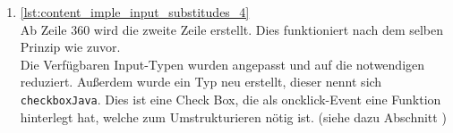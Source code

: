 \begin{enumerate}
	\item \autoref{lst:content_imple_input_substitudes_4}\\
	Ab Zeile 360 wird die zweite Zeile erstellt. Dies funktioniert nach dem selben Prinzip wie zuvor.\\
	Die Verfügbaren Input-Typen wurden angepasst und auf die notwendigen reduziert. Außerdem wurde ein Typ neu erstellt, dieser nennt sich \texttt{checkboxJava}. Dies ist eine Check Box, die als oncklick-Event eine Funktion hinterlegt hat, welche zum Umstrukturieren nötig ist. (siehe dazu Abschnitt )	
	
	
\end{enumerate}
